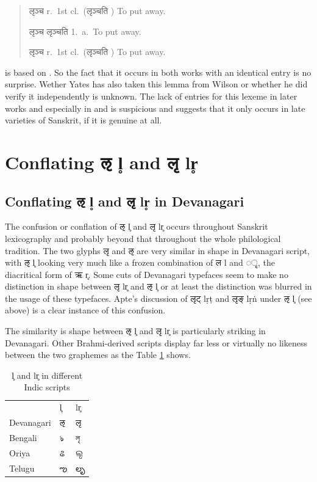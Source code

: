 \begin{quote}
{\devbfont लृञ्च} r.~1st cl.~({\devfont लृञ्चति} ) To put away. \citep[][p.~722]{wil}

{\devbfont लृञ्च} {\devfont लृञ्चति}  1.~a.~To put away. \citep[][p.~646]{yat}

{\devbfont लृञ्च} r.~1st cl.~({\devfont लृञ्चति} ) To put away. \citep[][p.~619]{shs}
\end{quote}

\citet{shs} is based on \citet{wil}. So the fact that it occurs in both works with an identical entry is no surprise. Wether Yates has also taken this lemma from Wilson or whether he did verify it independently is unknown. The lack of entries for this lexeme in later works and especially in \citet{pwg} and \citet{mw} is suspicious and suggests that it only occurs in late varieties of Sanskrit, if it is genuine at all.

\section{Conflating {\devhmfont ऌ} l̥ and {\devhmfont लृ} lr̥}
\subsection{Conflating {\devhmfont ऌ} l̥ and {\devhmfont लृ} lr̥ in Devanagari} 

The confusion or conflation of {\devfont ऌ} l̥  and {\devfont लृ} lr̥ occurs throughout Sanskrit lexicography and probably beyond that throughout the whole philological tradition. The two glyphs {\devfont लृ} and {\devfont ऌ} are very similar in shape in Devanagari script, with {\devfont ऌ} l̥ looking very much like a frozen combination of {\devfont ल} l and {\devfont ◌ृ}, the diacritical form of {\devfont ऋ} r̥. Some cuts of Devanagari typefaces seem to make no distinction in shape between  {\devfont लृ} lr̥ and {\devfont ऌ} l̥ or at least the distinction was blurred in the usage of these typefaces. Apte’s discussion of {\devfont लृट्} lṛṭ and {\devfont लृङ्} lṛṅ under {\devfont ऌ} l̥  (see above) is a clear instance of this confusion.

The similarity is shape between {\devfont ऌ} l̥ and {\devfont लृ} lr̥ is particularly striking in Devanagari. Other Brahmi-derived scripts display far less or virtually no likeness between the two graphemes as the Table \ref{tab:indic} shows. 

\begin{table}[!h]
\begin{center}
\begin{tabular}{lll}
&l̥&lr̥\\
Devanagari&{\devfont ऌ}&{\devfont लृ}\\
Bengali&{\bangfont ঌ}&{\bangfont লৃ}\\
Oriya&{\orifont ଌ}&{\orifont ଲୃ}\\
Telugu&{\telfont ఌ}&{\telfont లృ}\\
\end{tabular}
\end{center}
\caption[l̥ and lr̥ in different Indic scripts]{\label{tab:indic}l̥ and lr̥ in different Indic scripts}
\end{table}


